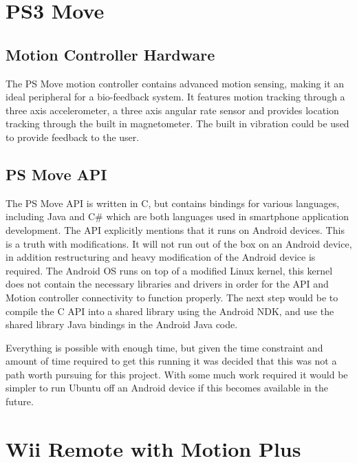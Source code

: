 \documentclass[11pt,twoside,a4paper]{report}
\begin{document}
\section{PS3 Move}

\subsection{Motion Controller Hardware}
The PS Move motion controller contains advanced motion sensing, making it an ideal peripheral for a bio-feedback system. It features motion tracking through a three axis accelerometer, a three axis angular rate sensor and provides location tracking through the built in magnetometer. The built in vibration could be used to provide feedback to the user. %


\subsection{PS Move API}

The PS Move API is written in C, but contains bindings for various languages, including Java and C\# which are both languages used in smartphone application development. The API explicitly mentions that it runs on Android devices. This is a truth with modifications. It will not run out of the box on an Android device, in addition restructuring and heavy modification of the Android device is required.  The Android OS runs on top of a modified Linux kernel, this kernel does not contain the necessary libraries and drivers in order for the API and Motion controller connectivity to function properly. %
The next step would be to compile the C API into a shared library using the Android NDK, and use the shared library Java bindings in the Android Java code.

Everything is possible with enough time, but given the time constraint and amount of time required to get this running it was decided that this was not a path worth pursuing for this project. With some much work required it would be simpler to run Ubuntu off an Android device if this becomes available in the future. %

\section{Wii Remote with Motion Plus}
\end{document}

